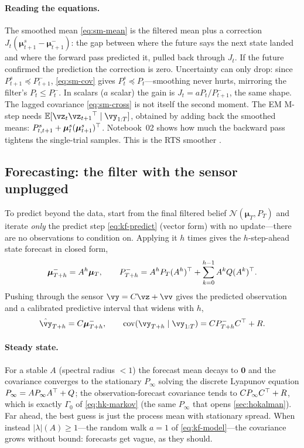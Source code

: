 \documentclass[11pt]{article}
\theoremstyle{plain}
\theoremstyle{definition}
\theoremstyle{remark}
\theoremstyle{definition}
\newcommand{\E}{\mathbb{E}}
\newcommand{\Normal}{\mathcal{N}}
\newcommand{\vmu}{\bm{\mu}}
\begin{document}
\paragraph{Reading the equations.} The smoothed mean \eqref{eq:sm-mean} is the
filtered mean plus a correction $J_t(\vmu_{t+1}^s - \vmu_{t+1}^-)$: the gap
between where the future says the next state landed and where the forward pass
predicted it, pulled back through $J_t$. If the future confirmed the prediction
the correction is zero. Uncertainty can only drop: since $P_{t+1}^s \preceq
P_{t+1}^-$, \eqref{eq:sm-cov} gives $P_t^s \preceq P_t$---smoothing never hurts,
mirroring the filter's $P_t \le P_t^-$. In scalars ($a$ scalar) the gain is $J_t =
a P_t / P_{t+1}^-$, the same shape. The lagged covariance \eqref{eq:sm-cross} is
not itself the second moment. The EM M-step needs
$\E[\vz_t\vz_{t+1}\trp\mid\vy_{1:T}]$, obtained by adding back the smoothed means:
$P_{t,t+1}^s + \vmu_t^s(\vmu_{t+1}^s)\trp$.
Notebook~02 shows how much the backward pass tightens the single-trial samples.
This is the RTS smoother \parencite{Rauch1965-rts}.

\subsection{Forecasting: the filter with the sensor unplugged}

To predict beyond the data, start from the final filtered belief $\Normal(\vmu_T,
P_T)$ and iterate \emph{only} the predict step \eqref{eq:kf-predict} (vector form)
with no update---there are no observations to condition on. Applying it $h$ times
gives the $h$-step-ahead state forecast in closed form,
\begin{equation}\label{eq:fc-state}
    \vmu_{T+h}^- = A^h \vmu_T, \qquad
    P_{T+h}^- = A^h P_T (A^h)\trp + \sum_{k=0}^{h-1} A^k Q (A^k)\trp .
\end{equation}
Pushing through the sensor $\vy = C\vz + \vv$ gives the predicted observation and
a calibrated predictive interval that widens with $h$,
\begin{equation}\label{eq:fc-obs}
    \hat{\vy}_{T+h} = C\vmu_{T+h}^-, \qquad
    \cov(\vy_{T+h} \mid \vy_{1:T}) = C P_{T+h}^- C\trp + R .
\end{equation}

\paragraph{Steady state.} For a stable $A$ (spectral radius $< 1$) the forecast
mean decays to $\mathbf 0$ and the covariance converges to the stationary
$P_\infty$ solving the discrete Lyapunov equation $P_\infty = A P_\infty A{^\top} +
Q$; the observation-forecast covariance tends to $C P_\infty C{^\top} + R$, which is
exactly $\Gamma_0$ of \eqref{eq:hk-markov} (the same $P_\infty$ that opens
\cref{sec:hokalman}). Far ahead, the best guess is just the process mean with
stationary spread. When instead $|\lambda|(A) \geq 1$---the random walk $a = 1$ of
\eqref{eq:kf-model}---the covariance grows without bound: forecasts get vague, as
they should.
\end{document}
